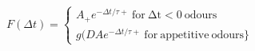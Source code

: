  $F(\Delta t) =  \begin{cases} A_{+} e^{−\Delta t/τ+}\:\mathrm{for\:\Delta t <0\:odours}\\g(DA e^{−\Delta t/τ+}\:\mathrm{for\:appetitive\:odours}\} \end{cases}$
 